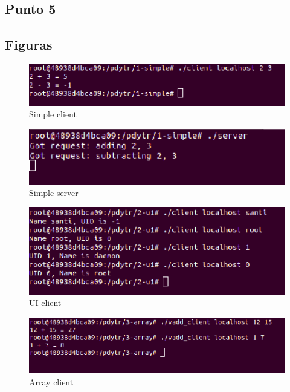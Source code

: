 \documentclass[12pt,journal,compsoc]{IEEEtran}
\begin{document}
\subsection{Punto 5}

\label{50-times-client}


\subsection{Figuras}

\begin{figure}[H]
\centering
\includegraphics[width=125mm]{capturas/1-simple-client.png}
\caption{Simple client}
\label{fig:1-simple-client}
\end{figure}

\begin{figure}[H]
\centering
\includegraphics[width=125mm]{capturas/1-simple-server.png}
\caption{Simple server}
\label{fig:1-simple-server}
\end{figure}

\begin{figure}[H]
\centering
\includegraphics[width=125mm]{capturas/2-ui-client.png}
\caption{UI client}
\label{fig:2-ui-client}
\end{figure}

\begin{figure}[H]
\centering
\includegraphics[width=125mm]{capturas/3-array-client.png}
\caption{Array client}
\label{fig:3-array-client}
\end{figure}
\end{document}
